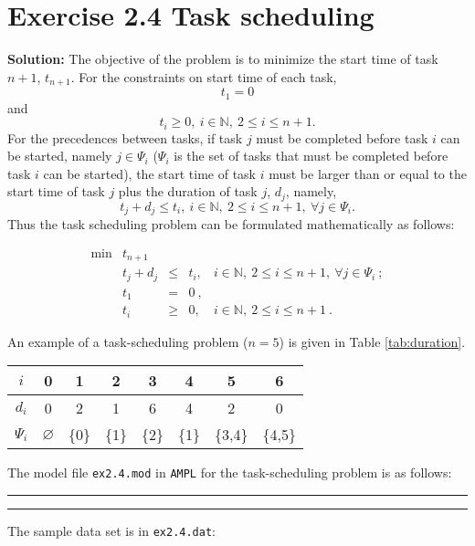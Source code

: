 \section{Exercise 2.4 Task scheduling}
\textbf{Solution:}
The objective of the problem is to minimize the start time of task $n+1$, $t_{n+1}$. For the constraints on start time of each task, $$t_1 = 0$$ and $$t_i \geq 0, ~i \in \mathbb{N}, ~2 \leq i \leq n+1.$$ For the precedences between tasks, if task $j$ must be completed before task $i$ can be started, namely $j \in \Psi_i$ ($\Psi_i$ is the set of tasks that must be completed before task $i$ can be started), the start time of task $i$ must be larger than or equal to the start time of task $j$ plus the duration of task $j$, $d_j$, namely, $$t_j + d_j \leq t_i,~i \in \mathbb{N}, ~2 \leq i \leq n+1,~\forall j \in \Psi_i.$$ Thus the task scheduling problem can be formulated mathematically as follows:

\[
\begin{array}{rrcll}
 \min & t_{n+1}  &  &   & \\
      &  t_j + d_j  &   \leq  & t_i, &i \in \mathbb{N}, ~2 \leq i \leq n+1,~\forall j \in \Psi_i~; \\
      &  t_1 & = & 0~, & \\
      &  t_i & \geq & 0, & i \in \mathbb{N}, ~2 \leq i \leq n+1~.
\end{array}
\]

An example of a task-scheduling problem ($n=5$) is given in Table \ref{tab:duration}.

\begin{table*}[!h]
\centering
\small
\begin{tabular}{|c|c|c|c|c|c|c|c|}\hline

$i$ & 0 & 1 & 2 & 3 & 4 & 5 & 6  \\\hline
$d_i$ & 0 & 2 & 1 & 6 & 4 & 2 & 0 \\\hline
$\Psi_i$ & $\varnothing$ & \{0\} & \{1\} & \{2\} & \{1\} & \{3,4\} & \{4,5\} \\\hline
\end{tabular}
\caption{Duration of each task, and precedences between tasks}
\label{tab:duration}
\end{table*}

The model file {\tt ex2.4.mod} in {\tt AMPL} for the task-scheduling problem is as follows:

\bigskip
\hrule
\small

\normalsize
\hrule
\bigskip

The sample data set is in {\tt ex2.4.dat}:

